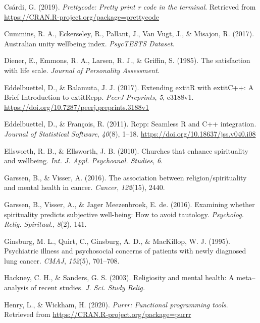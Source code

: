 \documentclass[
  english,
  man]{apa6}
\begin{document}
\leavevmode\hypertarget{ref-R-prettycode}{}%
Csárdi, G. (2019). \emph{Prettycode: Pretty print r code in the terminal}. Retrieved from \url{https://CRAN.R-project.org/package=prettycode}

\leavevmode\hypertarget{ref-Cummins2017-ur}{}%
Cummins, R. A., Eckerseley, R., Pallant, J., Van Vugt, J., \& Misajon, R. (2017). Australian unity wellbeing index. \emph{PsycTESTS Dataset}.

\leavevmode\hypertarget{ref-Diener1985-xy}{}%
Diener, E., Emmons, R. A., Larsen, R. J., \& Griffin, S. (1985). The satisfaction with life scale. \emph{Journal of Personality Assessment}.

\leavevmode\hypertarget{ref-R-Rcpp_b}{}%
Eddelbuettel, D., \& Balamuta, J. J. (2017). Extending extitR with extitC++: A Brief Introduction to extitRcpp. \emph{PeerJ Preprints}, \emph{5}, e3188v1. \url{https://doi.org/10.7287/peerj.preprints.3188v1}

\leavevmode\hypertarget{ref-R-Rcpp_a}{}%
Eddelbuettel, D., \& François, R. (2011). Rcpp: Seamless R and C++ integration. \emph{Journal of Statistical Software}, \emph{40}(8), 1--18. \url{https://doi.org/10.18637/jss.v040.i08}

\leavevmode\hypertarget{ref-Ellsworth2010-yu}{}%
Ellsworth, R. B., \& Ellsworth, J. B. (2010). Churches that enhance spirituality and wellbeing. \emph{Int. J. Appl. Psychoanal. Studies}, \emph{6}.

\leavevmode\hypertarget{ref-Garssen2016-km}{}%
Garssen, B., \& Visser, A. (2016). The association between religion/spirituality and mental health in cancer. \emph{Cancer}, \emph{122}(15), 2440.

\leavevmode\hypertarget{ref-Garssen2016-kb}{}%
Garssen, B., Visser, A., \& Jager Meezenbroek, E. de. (2016). Examining whether spirituality predicts subjective well-being: How to avoid tautology. \emph{Psycholog. Relig. Spiritual.}, \emph{8}(2), 141.

\leavevmode\hypertarget{ref-Ginsburg1995-jr}{}%
Ginsburg, M. L., Quirt, C., Ginsburg, A. D., \& MacKillop, W. J. (1995). Psychiatric illness and psychosocial concerns of patients with newly diagnosed lung cancer. \emph{CMAJ}, \emph{152}(5), 701--708.

\leavevmode\hypertarget{ref-Hackney2003-rs}{}%
Hackney, C. H., \& Sanders, G. S. (2003). Religiosity and mental health: A meta--analysis of recent studies. \emph{J. Sci. Study Relig.}

\leavevmode\hypertarget{ref-R-purrr}{}%
Henry, L., \& Wickham, H. (2020). \emph{Purrr: Functional programming tools}. Retrieved from \url{https://CRAN.R-project.org/package=purrr}
\end{document}
